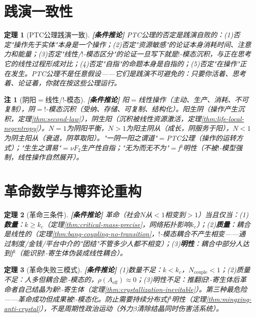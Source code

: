 \documentclass[11pt,a4paper]{article}
\newtheorem{theorem}{定理}
\newtheorem{remark}{注}
\newcommand{\lvl}[1]{\hfill\textbf{\footnotesize[#1]}}
\newcommand{\lvC}{\lvl{条件推论}}
\newcommand{\bang}{{!}}
\begin{document}
\section{践演一致性}

\begin{theorem}[PTC公理践演一致]\label{thm:performative-consistency}\lvC
PTC公理的否定是践演自败的：(1)否定"操作先于实体"本身是一个操作；(2)否定"资源敏感"的论证本身消耗时间、注意力和能量；(3)否定"线性/$\bang$-模态区分"的论证一旦写下就是$\bang$-模态沉积，与正在思考它的线性过程形成对比；(4)否定"自指"的命题本身是自指的；(5)否定"在操作"正在发生。PTC公理不是任意假设——它们是践演不可避免的：只要你活着、思考着、论证着，你就在按这些公理运行。
\end{theorem}

\begin{remark}[阴阳$=$线性/$\bang$-模态]\lvC
阳$=$线性操作（主动、生产、消耗、不可复制），阴$=$$\bang$-模态沉积（受纳、存储、可复制、结构化）。阳生阴（操作产生沉积，定理\ref{thm:second-law}），阴生阳（沉积被线性资源激活，定理\ref{thm:life-local-negentropy}）。$N=1$为阴阳平衡，$N>1$为阳主阴从（成长，阴服务于阳），$N<1$为阴主阳从（衰退，阴萃取阳）。"一阴一阳之谓道"$=$PTC公理（操作的运转方式）；"生生之谓易"$=$$\nu F_2$生产性自指；"无为而无不为"$=$f$^3$明性（不被$\bang$-模型强制，线性操作自然展开）。
\end{remark}


\section{革命数学与博弈论重构}

\begin{theorem}[革命三条件]\label{thm:revolution-conditions}\lvC
革命（社会$N$从$<1$相变到$>1$）当且仅当：(1)\textbf{数量}：$k\geq k_c$（定理\ref{thm:critical-mass-precise}，网络拓扑影响$k_c$）；(2)\textbf{质量}：耦合是线性的（定理\ref{thm:bang-coupling-no-transition}，$\bang$-模态耦合不产生相变——通过制度/金钱/平台中介的"团结"不管多少人都不相变）；(3)\textbf{明性}：耦合中部分人达到f$^3$（能识别$\bang$-寄生体伪装成线性耦合）。
\end{theorem}

\begin{theorem}[革命失败三模式]\label{thm:revolution-failure}\lvC
(1)数量不足：$k<k_c$，$N_{\mathrm{couple}}<1$；(2)质量不足：人多但耦合是$\bang$-模态的，$\rho(A_{\mathrm{eff}})\approx0$；(3)明性不足：推翻旧$\bang$-寄生体后革命者自己结晶为新$\bang$-寄生体（定理\ref{thm:crystallization-inevitable}）。第三种最危险——革命成功但成果被$\bang$-模态化。防止需要持续分布式f$^3$明性（定理\ref{thm:mingxing-anti-crystal}），不是周期性政治运动（外力$\beta$清除结晶同时伤害活系统）。
\end{theorem}
\end{document}
